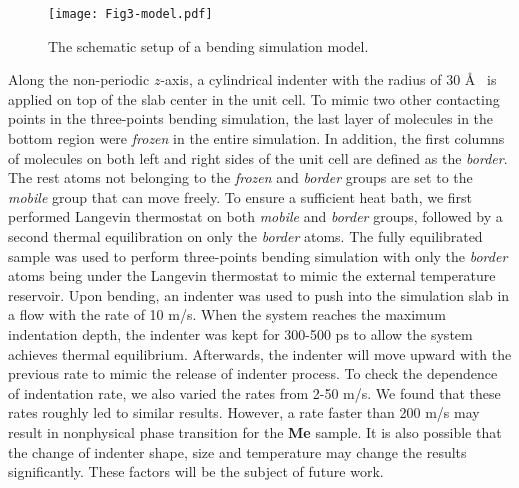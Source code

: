 \documentclass[prb,superscriptaddress,longbibliography, twocolumn]{revtex4-1}
\begin{document}
\begin{figure*}[htbp]
\centering
\texttt{[image: Fig3-model.pdf]}
\caption{\label{Fig3} The schematic setup of a bending simulation model.}
\end{figure*}

Along the non-periodic $z$-axis, a cylindrical indenter with the radius of 30 \AA~ is applied on top of the slab center in the unit cell. To mimic two other contacting points in the three-points bending simulation, the last layer of molecules in the bottom region were \textit{frozen} in the entire simulation. In addition, the first columns of molecules on both left and right sides of the unit cell are defined as the \textit{border}. The rest atoms not belonging to the \textit{frozen} and \textit{border} groups are set to the \textit{mobile} group that can move freely. To ensure a sufficient heat bath, we first performed Langevin thermostat \cite{langevin} on both \textit{mobile} and \textit{border} groups, followed by a second thermal equilibration on only the \textit{border} atoms. The fully equilibrated sample was used to perform three-points bending simulation with only the \textit{border} atoms being under the Langevin thermostat to mimic the external temperature reservoir. Upon bending, an indenter was used to push into the simulation slab in a flow with the rate of 10 m/s. When the system reaches the maximum indentation depth, the indenter was kept for 300-500 ps to allow the system achieves thermal equilibrium. Afterwards, the indenter will move upward with the previous rate to mimic the release of indenter process. To check the dependence of indentation rate, we also varied the rates from 2-50 m/s. We found that these rates roughly led to similar results. However, a rate faster than 200 m/s may result in nonphysical phase transition for the \textbf{Me} sample. It is also possible that the change of indenter shape, size and temperature may change the results significantly. These factors will be the subject of future work.
\end{document}
